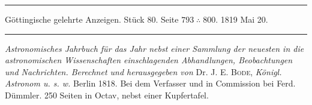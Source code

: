 \par\bigskip
\hypertarget{native-616-lower}{}
\begin{center}
\parbox{.92\linewidth}{\centering\small
\rule{\linewidth}{.3pt}\par\smallskip
Göttingische gelehrte Anzeigen. Stück 80. Seite $793\;\therefore\;800$. 1819 Mai 20.\par\smallskip
\rule{\linewidth}{.3pt}}
\end{center}
\par\medskip

\emph{Astronomisches Jahrbuch für das Jahr {} nebst einer Sammlung der neuesten in die astronomischen Wissenschaften einschlagenden Abhandlungen, Beobachtungen und Nachrichten. Berechnet und herausgegeben von} Dr. J. E. \textsc{Bode}, \emph{Königl. Astronom u. s. w.} Berlin 1818. Bei dem Verfasser und in Commission bei Ferd. Dümmler. 250 Seiten in Octav, nebst einer Kupfertafel.

